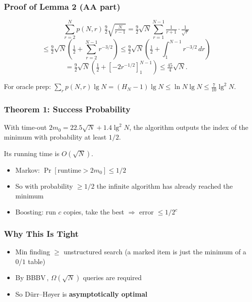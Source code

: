 \begin{frame}
  \frametitle{Proof of Lemma 2 (AA part)}
  {\small
  \[
    \sum_{r=2}^{N} p(N,r)\,\tfrac{9}{2}\sqrt{\tfrac{N}{r-1}}
    = \tfrac{9}{2}\sqrt{N}\sum_{r=1}^{N-1}\tfrac{1}{r+1}\cdot\tfrac{1}{\sqrt{r}}
  \]
  \[
    \le \tfrac{9}{2}\sqrt{N}\left(\tfrac{1}{2} + \sum_{r=2}^{N-1} r^{-3/2}\right)
    \le \tfrac{9}{2}\sqrt{N}\left(\tfrac{1}{2} + \int_1^{N-1} r^{-3/2}\,dr\right)
  \]
  \[
    = \tfrac{9}{2}\sqrt{N}\left(\tfrac{1}{2} + \left[-2r^{-1/2}\right]_1^{N-1}\right)
    \le \tfrac{45}{4}\sqrt{N}.
  \]
  }

  \vspace{0.5cm}
  {\small For oracle prep: $\sum_r p(N,r)\lg N = (H_N - 1)\lg N \le \ln N \lg N \le \tfrac{7}{10}\lg^2 N$.}
\end{frame}

\begin{frame}
  \frametitle{Theorem 1: Success Probability}
  \begin{theorem}
    With time-out $2 m_0 = 22.5\sqrt{N} + 1.4\lg^2 N$, the algorithm outputs the index of the minimum with probability at least $1/2$.

    \vspace{0.3em}
    Its running time is $O(\sqrt{N})$.
  \end{theorem}

  \vspace{0.5cm}
  \begin{itemize}[<+->]
    \item Markov: $\Pr[\text{runtime} > 2 m_0] \le 1/2$
    \item So with probability $\ge 1/2$ the infinite algorithm has already reached the minimum
    \item Boosting: run $c$ copies, take the best $\Rightarrow$ error $\le 1/2^c$
  \end{itemize}
\end{frame}

\begin{frame}
  \frametitle{Why This Is Tight}
  \begin{itemize}[<+->]
    \item Min finding $\ge$ unstructured search (a marked item is just the minimum of a $0$/$1$ table)
    \item By BBBV\,\cite{bennett1997strengths}, $\Omega(\sqrt{N})$ queries are required
    \item So D\"urr--H\o yer is \textbf{asymptotically optimal}
  \end{itemize}

  \vspace{0.5cm}
\end{frame}

